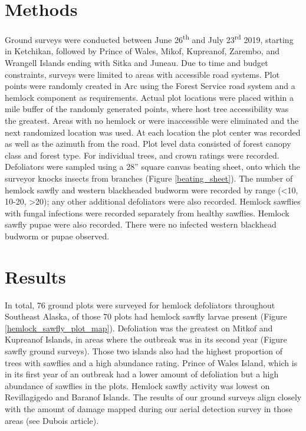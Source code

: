 \begin{multicols}{2}
\section{Methods}

Ground surveys were conducted between June 26\textsuperscript{th} and July 23\textsuperscript{rd} 2019, starting in Ketchikan, followed by Prince of Wales, Mikof, Kupreanof, Zarembo, and Wrangell Islands ending with Sitka and Juneau.  Due to time and budget constraints, surveys were limited to areas with accessible road systems.  Plot points were randomly created in Arc using the Forest Service road system and a hemlock component as requirements.  Actual plot locations were placed within a  mile buffer of the randomly generated points, where host tree accessibility was the greatest.  Areas with no hemlock or were inaccessible were eliminated and the next randomized location was used.   At each location the plot center was recorded as well as the azimuth from the road.  Plot level data consisted of forest canopy class and forest type. For individual trees,  and crown ratings were recorded. Defoliators were sampled using a 28” square canvas beating sheet, onto which the surveyor knocks insects from branches (Figure \ref{beating_sheet}).  The number of hemlock sawfly and western blackheaded budworm were recorded by range (<10, 10-20, >20); any other additional defoliators were also recorded.  Hemlock sawflies with fungal infections were recorded separately from healthy sawflies.  Hemlock sawfly pupae were also recorded.  There were no infected western blackhead budworm or pupae observed. 

\section{Results}
 
In total, 76 ground plots were surveyed for hemlock defoliators throughout Southeast Alaska, of those 70 plots had hemlock sawfly larvae present (Figure \ref{hemlock_sawfly_plot_map}).  Defoliation was the greatest on Mitkof and Kupreanof Islands, in areas where the outbreak was in its second year (Figure sawfly ground surveys).  Those two islands also had the highest proportion of trees with sawflies and a high abundance rating.  Prince of Wales Island, which is in its first year of an outbreak had a lower amount of defoliation but a high abundance of sawflies in the plots. Hemlock sawfly activity was lowest on Revillagigedo and Baranof Islands.   The results of our ground surveys align closely with the amount of damage mapped during our aerial detection survey in those areas (see Dubois article). 


\end{multicols}
